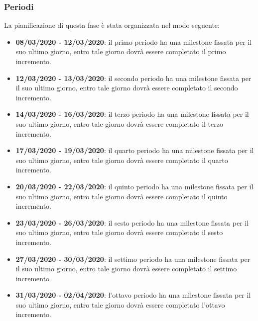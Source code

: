 \subsubsection{Periodi}
La pianificazione di questa fase è stata organizzata nel modo seguente:
\begin{itemize}
\item \textbf{08/03/2020 - 12/03/2020}: il primo periodo ha una milestone fissata per il suo ultimo giorno, entro tale giorno dovrà essere completato il primo incremento.

\item \textbf{12/03/2020 - 13/03/2020}: il secondo periodo ha una milestone fissata per il suo ultimo giorno, entro tale giorno dovrà essere completato il secondo incremento.

\item \textbf{14/03/2020 - 16/03/2020}: il terzo periodo ha una milestone fissata per il suo ultimo giorno, entro tale giorno dovrà essere completato il terzo incremento.

\item \textbf{17/03/2020 - 19/03/2020}: il quarto periodo ha una milestone fissata per il suo ultimo giorno, entro tale giorno dovrà essere completato il quarto incremento.

\item \textbf{20/03/2020 - 22/03/2020}: il quinto periodo ha una milestone fissata per il suo ultimo giorno, entro tale giorno dovrà essere completato il quinto incremento.

\item \textbf{23/03/2020 - 26/03/2020}: il sesto periodo ha una milestone fissata per il suo ultimo giorno, entro tale giorno dovrà essere completato il sesto incremento.

\item \textbf{27/03/2020 - 30/03/2020}: il settimo periodo ha una milestone fissata per il suo ultimo giorno, entro tale giorno dovrà essere completato il settimo incremento.

\item \textbf{31/03/2020 - 02/04/2020}: l'ottavo periodo ha una milestone fissata per il suo ultimo giorno, entro tale giorno dovrà essere completato l'ottavo incremento.

\end{itemize}

